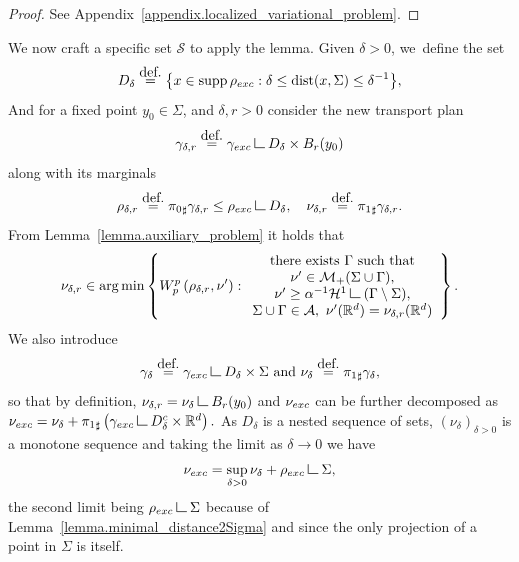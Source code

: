 \documentclass[11pt]{article}
\numberwithin{equation}{section}
\theoremstyle{definition}
\newcommand{\eqdef}{\ensuremath{\stackrel{\mbox{\upshape\tiny def.}}{=}}}
\newcommand\LM[1]{\hbox{\vrule width.5pt \vbox to#1pt{\vfill \hrule width#1pt height.5pt}}}
\newcommand\LL{{\mathchoice {\>\LM7\>}{\>\LM7\>}{\,\LM5\,}{\,\LM{3.35}\,}}}
\newcommand{\mres}{\LL}
\newcommand{\RR}{\mathbb{R}}
\DeclareMathOperator*{\argmin}{arg\,min}
\DeclareMathOperator{\dist}{dist}
\DeclareMathOperator{\supp}{supp}
\newcommand{\nuexc}{\nu_{\textup{exc}}}
\newcommand{\rhoexc}{\rho_{\textup{exc}}}
\newcommand{\gammaexc}{\gamma_{\textup{exc}}}
\begin{document}
\begin{proof} See Appendix~\ref{appendix.localized_variational_problem}.
\end{proof}
We now craft a specific set $\mathcal{S}$ to apply the lemma.
Given $\delta>0$, we~define the
set
\begin{equation} \label{set_D_delta}
D_{\delta} \eqdef
\bigl\{
x \in \supp\rhoexc :
\delta \le \dist(x, \Sigma) \le \delta^{-1}
\bigr\},
\end{equation}
And for a fixed point $y_0 \in \Sigma$, and $\delta,r>0$ consider the new transport plan
\begin{equation}\label{gamma_delta}
\gamma_{\delta, r} \eqdef \gammaexc \mres D_{\delta}\times B_r(y_0)
\end{equation}
along with its marginals\vspace*{-3pt}
\begin{equation}\label{nu_delta}
\rho_{\delta, r} \eqdef {\pi_{0}}_\sharp\gamma_{\delta,r} \le \rhoexc \mres D_{\delta},
\quad
\nu_{\delta, r} \eqdef {\pi_{1}}_\sharp\gamma_{\delta, r}.
\end{equation}
From Lemma~\ref{lemma.auxiliary_problem} it holds that
\begin{equation}\label{auxiliary_problem}
\nu_{\delta, r}
\in
\argmin
\left\{
W_p^p\left(
\rho_{\delta, r}, \nu'
\right) :
\begin{array}{c}
\text{there exists $\Gamma$ such that}\\
\nu' \in \mathcal{M}_+(\Sigma \cup \Gamma),\\
\nu' \ge \alpha^{-1}\mathcal{H}^1\mres (\Gamma\setminus\Sigma), \\
\Sigma \cup \Gamma \in \mathcal{A}, \
\nu'(\RR^d) = \nu_{\delta, r}(\RR^d)
\end{array}
\right\}.
\end{equation}
We also introduce\vspace*{-3pt}
\begin{equation}\label{measure_nu_delta}
\gamma_\delta\eqdef\gammaexc\mres D_{\delta}\times\Sigma
\text{ and }
\nu_\delta \eqdef {\pi_1}_\sharp \gamma_\delta,
\end{equation}
so that by definition, $\nu_{\delta, r} = \nu_\delta \mres B_r(y_0)$ and $\nuexc$ can be further decomposed as
$
\nuexc = \nu_\delta + {\pi_{1}}_\sharp\left(\gammaexc \mres D_\delta^c \times \RR^d\right).
$
As $D_\delta$ is a nested sequence of sets, $(\nu_\delta)_{\delta > 0}$ is a monotone sequence and taking the limit as $\delta \to 0$ we have
\begin{equation}\label{nuexc.further_decomposition}
\nuexc = \sup_{\delta > 0} \nu_\delta + \rhoexc\mres \Sigma,
\end{equation}
the second limit being $\rhoexc\mres \Sigma$ because
of Lemma~\ref{lemma.minimal_distance2Sigma} and
since the only projection of a point in $\Sigma$ is itself.
\end{document}
